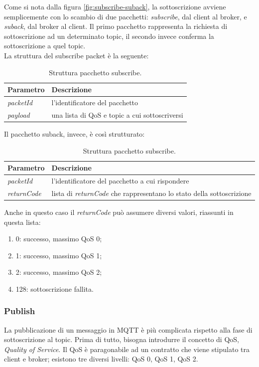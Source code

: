 \documentclass[Lau,binding=0.6cm,noexaminfo=true]{sapthesis}
\begin{document}
\begin{large}
Come si nota dalla figura \ref{fig:subscribe-suback}, la sottoscrizione avviene semplicemente con lo scambio di due pacchetti: \textit{subscribe}, dal client al broker, e \textit{suback}, dal broker al client. Il primo pacchetto rappresenta la richiesta di sottoscrizione ad un determinato topic, il secondo invece conferma la sottoscrizione a quel topic. \\
La struttura del subscribe packet è la seguente:

\begin{table}[h]
\caption{Struttura pacchetto subscribe.}
\label{tab:subscribe}
\begin{tabular}{lp{}}
\toprule
\textbf{Parametro} & \textbf{Descrizione} \\
\midrule
\textit{packetId} & l'identificatore del pacchetto \\
\textit{payload} & una lista di QoS e topic a cui sottoscriversi \\
\bottomrule
\end{tabular}
\end{table}
Il pacchetto suback, invece, è così strutturato:
\begin{table}[h]
\caption{Struttura pacchetto subscribe.}
\label{tab:subscribe}
\begin{tabular}{lp{}}
\toprule
\textbf{Parametro} & \textbf{Descrizione} \\
\midrule
\textit{packetId} & l'identificatore del pacchetto a cui rispondere \\
\textit{returnCode} & lista di \textit{returnCode} che rappresentano lo stato della sottoscrizione \\
\bottomrule
\end{tabular}
\end{table}

Anche in questo caso il \textit{returnCode} può assumere diversi valori, riassunti in questa lista:
\begin{enumerate}
\item 0: successo, massimo QoS 0;
\item 1: successo, massimo QoS 1;
\item 2: successo, massimo QoS 2;
\item 128: sottoscrizione fallita.
\end{enumerate}

\subsubsection{Publish}
La pubblicazione di un messaggio in MQTT è più complicata rispetto alla fase di sottoscrizione al topic. Prima di tutto, bisogna introdurre il concetto di QoS, \textit{Quality of Service}. Il QoS è paragonabile ad un contratto che viene stipulato tra client e broker; esistono tre diversi livelli: QoS 0, QoS 1, QoS 2.



\end{large}
\end{document}
